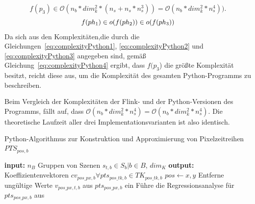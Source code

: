 %
\begin{equation} \label{eq:complexityPython3}
f(p_3) \in \mathcal{O}(n_b * dim_k^2 * (n_s + n_s * n_s^3)) = \mathcal{O}(n_b * dim_k^2 * n_s^4)).
\end{equation}
%
\begin{equation} \label{eq:complexityPython4}
f(ph_1) \in \mathnormal{o}(f(ph_2)) \in \mathnormal{o}(f(ph_3))
\end{equation}
%
Da sich aus den Komplexitäten,die durch die Gleichungen~\ref{eq:complexityPython1}, \ref{eq:complexityPython2} und \ref{eq:complexityPython3} angegeben sind, gemäß Gleichung~\ref{eq:complexityPython4} ergibt, dass $f(p_3$) die größte Komplexität besitzt, reicht diese aus, um die Komplexität des gesamten Python-Programms zu beschreiben.

Beim Vergleich der Komplexitäten der Flink- und der Python-Versionen des Programms, fällt auf, dass  $\mathcal{O}(n_b * dim_k^2 * n_s^4) = \mathcal{O}(n_b * dim_k^2 * n_s^4)$. Die theoretische Laufzeit aller drei Implementationsvarianten ist also identisch.

\begin{algorithm}[H]
\small
\caption{Python-Algorithmus zur Konstruktion und Approximierung von Pixelzeitreihen $PTS_{pos, b}$}
\label{alg:python}
\begin{algorithmic}[1]
	\State \textbf{input:} $n_B$ Gruppen von Szenen $s_{t, b} \in S_{b} | b \in B$, $dim_K$
	\State \textbf{output:} Koeffizientenvektoren $cv_{pos\_px, b} \forall pts_{pos\_tk, b} \in TK_{pos\_tk, b}$
	  \label{alg:iterB}
        		  \label{alg:iterX}
			  \label{alg:iterY}
				\State $pos \leftarrow x, y$  
				  \label{alg:iterPTS}
					\State Entferne ungültige Werte $v_{pos\_px, t, b}$ aus $pts_{pos\_px, b}$ ein  
				\EndFor
				\State Führe die Regressionsanalyse für $pts_{pos\_px, b}$ aus  \label{alg:regression}
			\EndFor
		\EndFor
	\EndFor
		
		 
	\EndFunction
\end{algorithmic}
\end{algorithm}

